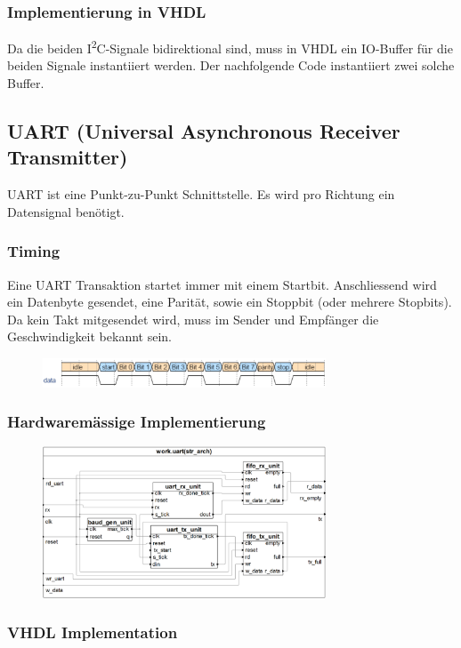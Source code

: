 \subsubsection{Implementierung in VHDL}
Da die beiden I\textsuperscript{2}C-Signale bidirektional sind, muss in VHDL ein IO-Buffer für die beiden Signale instantiiert werden. Der nachfolgende Code instantiiert zwei solche Buffer.


\subsection{UART (Universal Asynchronous Receiver Transmitter)}
UART ist eine Punkt-zu-Punkt Schnittstelle. Es wird pro Richtung ein Datensignal benötigt.

\subsubsection{Timing}
Eine UART Transaktion startet immer mit einem Startbit. Anschliessend wird ein Datenbyte gesendet, eine Parität, sowie ein Stoppbit (oder mehrere Stopbits). Da kein Takt mitgesendet wird, muss im Sender und Empfänger die Geschwindigkeit bekannt sein.
\begin{figure}[H]
    \includegraphics[width=0.75\textwidth]{images/uart_timing.png}
\end{figure}

\subsubsection{Hardwaremässige Implementierung}
\begin{figure}[H]
    \includegraphics[width=0.75\textwidth]{images/uart_hardware.png}
\end{figure}

\subsubsection{VHDL Implementation}

